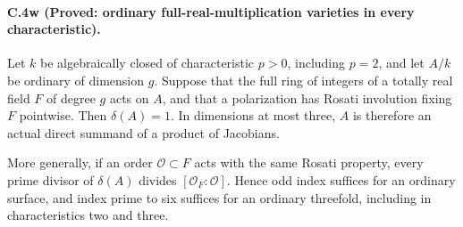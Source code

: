 \paragraph{C.4w (Proved: ordinary full-real-multiplication varieties in every characteristic).}
Let \(k\) be algebraically closed of characteristic \(p>0\),
including \(p=2\), and let \(A/k\) be ordinary of dimension
\(g\). Suppose that the full ring of integers of a totally
real field \(F\) of degree \(g\) acts on \(A\), and that a
polarization has Rosati involution fixing \(F\) pointwise.
Then \(\delta(A)=1\). In dimensions at most three,
\(A\) is therefore an actual direct summand of a product
of Jacobians.

More generally, if an order \(\mathcal O\subset F\)
acts with the same Rosati property, every prime
divisor of \(\delta(A)\) divides
\([\mathcal O_F:\mathcal O]\). Hence odd index
suffices for an ordinary surface, and index
prime to six suffices for an ordinary threefold,
including in characteristics two and three.

